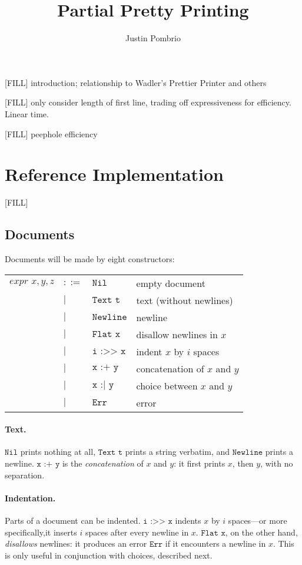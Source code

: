 \documentclass{article}
\makeatletter
\newenvironment{Table}
  {\begin{center}\begin{tabular}{l @{\;\;} l @{\;\;} l @{\quad\quad} l}}
  {\end{tabular}\end{center}}
\newcommand{\ind}[2]{\texttt{#1 :>> #2}}
\newcommand{\cat}[2]{\texttt{#1 :+ #2}}
\newcommand{\choice}[2]{\texttt{#1 :| #2}}
\newcommand{\txt}[1]{\texttt{Text #1}}
\newcommand{\nil}{\texttt{Nil}}
\newcommand{\err}{\texttt{Err}}
\newcommand{\nl}{\texttt{Newline}}
\renewcommand{\flat}[1]{\texttt{Flat #1}}
\makeatother
\begin{document}
\author{Justin Pombrio}
\title{Partial Pretty Printing}
\maketitle

[FILL] introduction; relationship to Wadler's Prettier Printer and others

[FILL] only consider length of first line, trading off expressiveness for efficiency. Linear time.

[FILL] peephole efficiency

\section{Reference Implementation}

[FILL]

\subsection{Documents}

Documents will be made by eight constructors:

\begin{Table}
  $\textit{expr } x, y, z$
  &$::=$& $\nil$ & empty document \\
    &$|$& $\txt{t}$ & text (without newlines) \\
    &$|$& $\nl$ & newline \\
    &$|$& $\flat{x}$ & disallow newlines in $x$ \\
    &$|$& $\ind{i}{x}$ & indent $x$ by $i$ spaces \\
    &$|$& $\cat{x}{y}$ & concatenation of $x$ and $y$ \\ 
    &$|$& $\choice{x}{y}$ & choice between $x$ and $y$ \\
    &$|$& $\err$ & error
\end{Table}

\paragraph{Text.} $\nil$ prints nothing at all, $\txt{t}$ prints a string verbatim, and $\nl$ prints
a newline. $\cat{x}{y}$ is the \emph{concatenation} of $x$ and $y$: it first prints $x$, then $y$,
with no separation.
\paragraph{Indentation.} Parts of a document can be indented. $\ind{i}{x}$ indents $x$ by $i$
spaces---or more specifically,it inserts $i$ spaces after every newline in $x$. $\flat{x}$, on the
other hand, \emph{disallows} newlines: it produces an error $\err$ if it encounters a newline in
$x$. This is only useful in conjunction with choices, described next.
\end{document}
